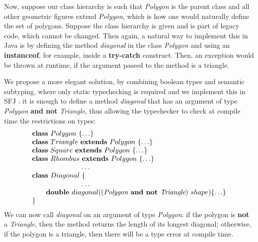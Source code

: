 \documentclass[runningheads]{llncs}
\begin{document}
\begin{example}[Polygons]
    Now, suppose our class hierarchy is such that \emph{Polygon} is the parent class and all other geometric figures extend \emph{Polygon}, which is how one would naturally define the set of polygons.
    Suppose the class hierarchy is given and is part of legacy code, which cannot be changed. Then again, a natural way to implement this in Java is by defining the method \emph{diagonal} in the class \emph{Polygon} and using an \textbf{instanceof}, for example, inside a \textbf{try-catch} construct. Then, an exception would be thrown at runtime, if the argument passed to the method is a triangle.

    We propose a more elegant solution, by combining boolean types and semantic subtyping, where only static typechecking is required and we implement this in SFJ \cite{UD20}: it is enough to define a method \emph{diagonal} that has an argument of type \emph{Polygon} \textbf{and not} \emph{Triangle}, thus allowing the typechecker to check at compile time the restrictions on types:
    $$
        \begin{array}{l}
            \mathbf{class} \  Polygon \ \{\ldots\}
            \\
            \mathbf{class} \  Triangle \ \mathbf{extends }\  Polygon\ \{\ldots\}
            \\
            \mathbf{class} \  Square \ \mathbf{extends }\  Polygon\ \{\ldots\}
            \\
            \mathbf{class} \  Rhombus \ \mathbf{extends }\  Polygon\ \{\ldots\}
            \\
            \hspace{2.5cm} \ldots
            \\
            \mathbf{class} \  Diagonal \ \{
            \\
            \hspace{2.5cm} \ldots \\
            \qquad \mathbf{double}\ diagonal((\textit{Polygon} \textbf{ and not }  \textit{Triangle}) \ shape)\{\ldots\}
            \\
            \}
        \end{array}
    $$
    We can now call \emph{diagonal} on an argument of type \emph{Polygon}: if the polygon is \textbf{not} a \emph{Triangle}, then the method returns the length of its longest diagonal; otherwise, if the polygon is a triangle, then there will be a type error at compile time.
\end{example}


\end{document}
